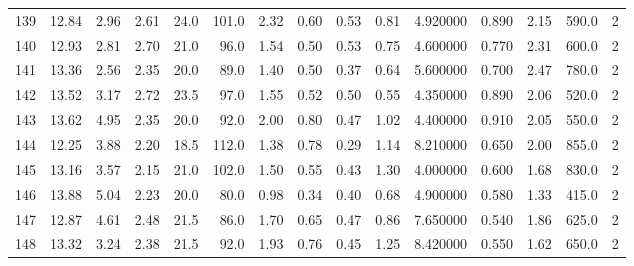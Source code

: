 \documentclass{article}
\begin{document}
\begin{tabular}{lrrrrrrrrrrrrrr}
    139 &    12.84 &        2.96 &  2.61 &               24.0 &      101.0 &           2.32 &        0.60 &                  0.53 &             0.81 &         4.920000 &  0.890 &                          2.15 &    590.0 &      2 \\
    140 &    12.93 &        2.81 &  2.70 &               21.0 &       96.0 &           1.54 &        0.50 &                  0.53 &             0.75 &         4.600000 &  0.770 &                          2.31 &    600.0 &      2 \\
    141 &    13.36 &        2.56 &  2.35 &               20.0 &       89.0 &           1.40 &        0.50 &                  0.37 &             0.64 &         5.600000 &  0.700 &                          2.47 &    780.0 &      2 \\
    142 &    13.52 &        3.17 &  2.72 &               23.5 &       97.0 &           1.55 &        0.52 &                  0.50 &             0.55 &         4.350000 &  0.890 &                          2.06 &    520.0 &      2 \\
    143 &    13.62 &        4.95 &  2.35 &               20.0 &       92.0 &           2.00 &        0.80 &                  0.47 &             1.02 &         4.400000 &  0.910 &                          2.05 &    550.0 &      2 \\
    144 &    12.25 &        3.88 &  2.20 &               18.5 &      112.0 &           1.38 &        0.78 &                  0.29 &             1.14 &         8.210000 &  0.650 &                          2.00 &    855.0 &      2 \\
    145 &    13.16 &        3.57 &  2.15 &               21.0 &      102.0 &           1.50 &        0.55 &                  0.43 &             1.30 &         4.000000 &  0.600 &                          1.68 &    830.0 &      2 \\
    146 &    13.88 &        5.04 &  2.23 &               20.0 &       80.0 &           0.98 &        0.34 &                  0.40 &             0.68 &         4.900000 &  0.580 &                          1.33 &    415.0 &      2 \\
    147 &    12.87 &        4.61 &  2.48 &               21.5 &       86.0 &           1.70 &        0.65 &                  0.47 &             0.86 &         7.650000 &  0.540 &                          1.86 &    625.0 &      2 \\
    148 &    13.32 &        3.24 &  2.38 &               21.5 &       92.0 &           1.93 &        0.76 &                  0.45 &             1.25 &         8.420000 &  0.550 &                          1.62 &    650.0 &      2 \\

\end{tabular}
\end{document}
